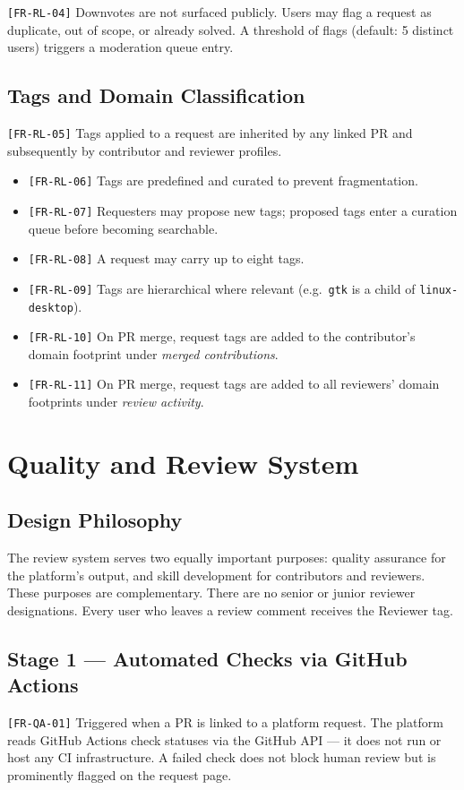 \documentclass[12pt,a4paper]{article}
\begin{document}
\texttt{[FR-RL-04]} Downvotes are not surfaced publicly. Users may flag a request as duplicate, out of scope, or already solved. A threshold of flags (default: 5 distinct users) triggers a moderation queue entry.

\subsection{Tags and Domain Classification}
\texttt{[FR-RL-05]} Tags applied to a request are inherited by any linked PR and subsequently by contributor and reviewer profiles.
\begin{itemize}
  \item \texttt{[FR-RL-06]} Tags are predefined and curated to prevent fragmentation.
  \item \texttt{[FR-RL-07]} Requesters may propose new tags; proposed tags enter a curation queue before becoming searchable.
  \item \texttt{[FR-RL-08]} A request may carry up to eight tags.
  \item \texttt{[FR-RL-09]} Tags are hierarchical where relevant (e.g.\ \texttt{gtk} is a child of \texttt{linux-desktop}).
  \item \texttt{[FR-RL-10]} On PR merge, request tags are added to the contributor's domain footprint under \emph{merged contributions}.
  \item \texttt{[FR-RL-11]} On PR merge, request tags are added to all reviewers' domain footprints under \emph{review activity}.
\end{itemize}

\section{Quality and Review System}

\subsection{Design Philosophy}
The review system serves two equally important purposes: quality assurance for the platform's output, and skill development for contributors and reviewers. These purposes are complementary. There are no senior or junior reviewer designations. Every user who leaves a review comment receives the Reviewer tag.

\subsection{Stage 1 --- Automated Checks via GitHub Actions}
\texttt{[FR-QA-01]} Triggered when a PR is linked to a platform request. The platform reads GitHub Actions check statuses via the GitHub API --- it does not run or host any CI infrastructure. A failed check does not block human review but is prominently flagged on the request page.
\end{document}
